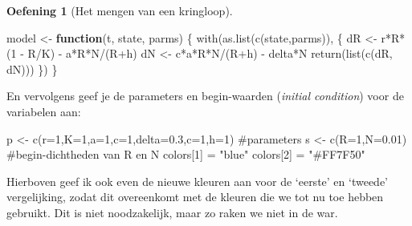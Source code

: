 \documentclass[
  a4paper,
]{scrbook}
\newenvironment{Shaded}{\begin{snugshade}}{\end{snugshade}}
\newcommand{\AttributeTok}[1]{\textcolor[rgb]{0.40,0.45,0.13}{#1}}
\newcommand{\CommentTok}[1]{\textcolor[rgb]{0.37,0.37,0.37}{#1}}
\newcommand{\ControlFlowTok}[1]{\textcolor[rgb]{0.00,0.23,0.31}{\textbf{#1}}}
\newcommand{\DecValTok}[1]{\textcolor[rgb]{0.68,0.00,0.00}{#1}}
\newcommand{\FloatTok}[1]{\textcolor[rgb]{0.68,0.00,0.00}{#1}}
\newcommand{\FunctionTok}[1]{\textcolor[rgb]{0.28,0.35,0.67}{#1}}
\newcommand{\NormalTok}[1]{\textcolor[rgb]{0.00,0.23,0.31}{#1}}
\newcommand{\OtherTok}[1]{\textcolor[rgb]{0.00,0.23,0.31}{#1}}
\newcommand{\SpecialCharTok}[1]{\textcolor[rgb]{0.37,0.37,0.37}{#1}}
\newcommand{\StringTok}[1]{\textcolor[rgb]{0.13,0.47,0.30}{#1}}
\theoremstyle{definition}
\newtheorem{exercise}{Oefening}[chapter]
\theoremstyle{remark}
\begin{document}
\begin{exercise}[Het mengen van een
kringloop]
\begin{Shaded}
\begin{Highlighting}[numbers=left,,]
\NormalTok{model }\OtherTok{\textless{}{-}} \ControlFlowTok{function}\NormalTok{(t, state, parms) \{}
  \FunctionTok{with}\NormalTok{(}\FunctionTok{as.list}\NormalTok{(}\FunctionTok{c}\NormalTok{(state,parms)), \{}
\NormalTok{    dR }\OtherTok{\textless{}{-}}\NormalTok{ r}\SpecialCharTok{*}\NormalTok{R}\SpecialCharTok{*}\NormalTok{(}\DecValTok{1} \SpecialCharTok{{-}}\NormalTok{ R}\SpecialCharTok{/}\NormalTok{K) }\SpecialCharTok{{-}}\NormalTok{ a}\SpecialCharTok{*}\NormalTok{R}\SpecialCharTok{*}\NormalTok{N}\SpecialCharTok{/}\NormalTok{(R}\SpecialCharTok{+}\NormalTok{h)}
\NormalTok{    dN }\OtherTok{\textless{}{-}}\NormalTok{ c}\SpecialCharTok{*}\NormalTok{a}\SpecialCharTok{*}\NormalTok{R}\SpecialCharTok{*}\NormalTok{N}\SpecialCharTok{/}\NormalTok{(R}\SpecialCharTok{+}\NormalTok{h) }\SpecialCharTok{{-}}\NormalTok{ delta}\SpecialCharTok{*}\NormalTok{N}
    \FunctionTok{return}\NormalTok{(}\FunctionTok{list}\NormalTok{(}\FunctionTok{c}\NormalTok{(dR, dN)))  }
\NormalTok{  \}) }
\NormalTok{\}  }
\end{Highlighting}
\end{Shaded}

En vervolgens geef je de parameters en begin-waarden (\emph{initial
condition}) voor de variabelen aan:

\begin{Shaded}
\begin{Highlighting}[]
\NormalTok{p }\OtherTok{\textless{}{-}} \FunctionTok{c}\NormalTok{(}\AttributeTok{r=}\DecValTok{1}\NormalTok{,}\AttributeTok{K=}\DecValTok{1}\NormalTok{,}\AttributeTok{a=}\DecValTok{1}\NormalTok{,}\AttributeTok{c=}\DecValTok{1}\NormalTok{,}\AttributeTok{delta=}\FloatTok{0.3}\NormalTok{,}\AttributeTok{c=}\DecValTok{1}\NormalTok{,}\AttributeTok{h=}\DecValTok{1}\NormalTok{)  }\CommentTok{\#parameters}
\NormalTok{s }\OtherTok{\textless{}{-}} \FunctionTok{c}\NormalTok{(}\AttributeTok{R=}\DecValTok{1}\NormalTok{,}\AttributeTok{N=}\FloatTok{0.01}\NormalTok{) }\CommentTok{\#begin{-}dichtheden van R en N  }
\NormalTok{colors[}\DecValTok{1}\NormalTok{] }\OtherTok{=} \StringTok{"blue"}
\NormalTok{colors[}\DecValTok{2}\NormalTok{] }\OtherTok{=} \StringTok{"\#FF7F50"}
\end{Highlighting}
\end{Shaded}

Hierboven geef ik ook even de nieuwe kleuren aan voor de `eerste' en
`tweede' vergelijking, zodat dit overeenkomt met de kleuren die we tot
nu toe hebben gebruikt. Dit is niet noodzakelijk, maar zo raken we niet
in de war.


\end{exercise}
\end{document}
